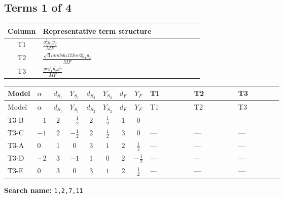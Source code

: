 \documentclass[8pt]{article}
\begin{document}
\begin{landscape}
\subsection*{Terms 1 of 4}
\begin{center}
\begin{tabular}{@{}c >{\raggedright\arraybackslash}p{0.82\linewidth}@{}}
\toprule
Column & Representative term structure \\
\midrule
T1 & \(\displaystyle \frac{g_{2}^{2} \overline{y_{1}} \overline{y_{2}}}{MF}\) \\
\midrule
T2 & \(\displaystyle \frac{\sqrt{3} lambda12Inv2 \overline{y_{1}} \overline{y_{2}}}{MF}\) \\
\midrule
T3 & \(\displaystyle \frac{ye \overline{y_{1}} \overline{y_{2}} \overline{ye}}{MF}\) \\
\midrule
\bottomrule
\end{tabular}
\end{center}
\smallskip
\tiny
\begin{longtable}{@{}llcccccc >{\raggedright\arraybackslash}p{0.21\linewidth} >{\raggedright\arraybackslash}p{0.21\linewidth} >{\raggedright\arraybackslash}p{0.21\linewidth}@{}}
\toprule
Model & $\alpha$ & $d_{S_1}$ & $Y_{S_1}$ & $d_{S_2}$ & $Y_{S_2}$ & $d_F$ & $Y_F$ & T1 & T2 & T3 \\
\midrule
\endfirsthead
\toprule
Model & $\alpha$ & $d_{S_1}$ & $Y_{S_1}$ & $d_{S_2}$ & $Y_{S_2}$ & $d_F$ & $Y_F$ & T1 & T2 & T3 \\
\midrule
\endhead
T3-B & $-1$ & $2$ & $-\frac{1}{2}$ & $2$ & $\frac{1}{2}$ & $1$ & $0$ & \scriptsize\adjustbox{max width=\linewidth}{$\begin{gathered} - \frac{3 g_{2}^{2} \overline{y_{1}} \overline{y_{2}}}{8 MF}\end{gathered}$} & \scriptsize\adjustbox{max width=\linewidth}{$\begin{gathered} - \frac{\sqrt{3} lambda12Inv2 \overline{y_{1}} \overline{y_{2}}}{6 MF}\end{gathered}$} & \scriptsize\adjustbox{max width=\linewidth}{$\begin{gathered} \frac{ye \overline{y_{1}} \overline{y_{2}} \overline{ye}}{8 MF}\end{gathered}$} \\
\midrule
T3-C & $-1$ & $2$ & $-\frac{1}{2}$ & $2$ & $\frac{1}{2}$ & $3$ & $0$ & --- & --- & --- \\
\midrule
T3-A & $0$ & $1$ & $0$ & $3$ & $1$ & $2$ & $\frac{1}{2}$ & --- & --- & --- \\
\midrule
T3-D & $-2$ & $3$ & $-1$ & $1$ & $0$ & $2$ & $-\frac{1}{2}$ & --- & --- & --- \\
\midrule
T3-E & $0$ & $3$ & $0$ & $3$ & $1$ & $2$ & $\frac{1}{2}$ & --- & --- & --- \\
\midrule
\bottomrule
\end{longtable}
\clearpage
\noindent\textbf{Search name: }\texttt{1,2,7,11}\par\smallskip

\end{landscape}
\end{document}
